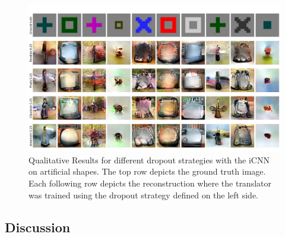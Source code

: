 \begin{figure}[ht]
  \centering
  \includegraphics[width=1\textwidth]{plots/dropout_qual_eval_icnn_art.JPEG}
  \caption[Experiment 1: Reconstructed images for iCNN on artificial shapes]{Qualitative Results for different dropout strategies with the iCNN on artificial shapes. The top row depicts the ground truth image. Each following row depicts the reconstruction where the translator was trained using the dropout strategy defined on the left side.}\label{fig:dropout_qual_eval_icnn_art}
\end{figure}

\subsection{Discussion}



  
